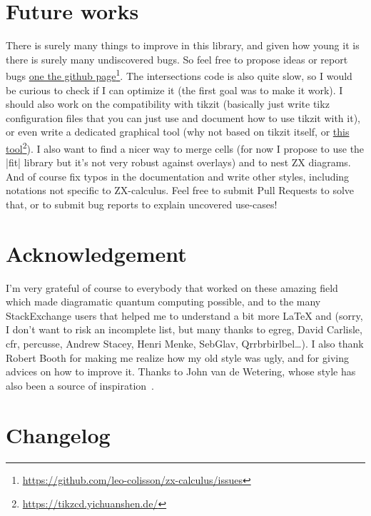 \documentclass[a4paper,doc2]{ltxdoc} %
\newcommand{\mylink}[2]{\href{#1}{#2}\footnote{\url{#1}}}
\begin{document}
\section{Future works}

There is surely many things to improve in this library, and given how young it is there is surely many undiscovered bugs. So feel free to propose ideas or report bugs \mylink{https://github.com/leo-colisson/zx-calculus/issues}{one the github page}. The intersections code is also quite slow, so I would be curious to check if I can optimize it (the first goal was to make it work). I should also work on the compatibility with tikzit (basically just write tikz configuration files that you can just use and document how to use tikzit with it), or even write a dedicated graphical tool (why not based on tikzit itself, or \mylink{https://tikzcd.yichuanshen.de/}{this tool}). I also want to find a nicer way to merge cells (for now I propose to use the |fit| library but it's not very robust against overlays) and to nest ZX diagrams. And of course fix typos in the documentation and write other styles, including notations not specific to ZX-calculus. Feel free to submit Pull Requests to solve that, or to submit bug reports to explain uncovered use-cases!

\section{Acknowledgement}

I'm very grateful of course to everybody that worked on these amazing field which made diagramatic quantum computing possible, and to the many StackExchange users that helped me to understand a bit more \LaTeX{} and \tikzname{} (sorry, I don't want to risk an incomplete list, but many thanks to egreg, David Carlisle, cfr, percusse, Andrew Stacey, Henri Menke, SebGlav, Qrrbrbirlbel\dots{}). I also thank Robert Booth for making me realize how my old style was ugly, and for giving advices on how to improve it. Thanks to John van de Wetering, whose style has also been a source of inspiration~\cite{van20_ZXcalculusWorkingQuantum}.

\section{Changelog}
\end{document}
